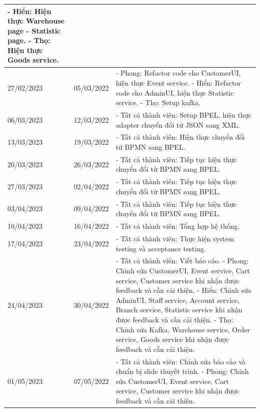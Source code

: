 {\begin{longtable}{| p{2cm} | p{2cm} | p{10cm} |}
    \newline
    - Hiển: Hiện thực Warehouse page - Statistic page. 
    \newline
    - Thọ: Hiện thực Goods service. \\
	\hline
	27/02/2023 & 05/03/2022 & 
    - Phong: Refactor code cho CustomerUI, hiện thực Event service. 
    \newline
    - Hiển: Refactor code cho AdminUI, hiện thực Statistic service. 
    \newline
    - Thọ: Setup kafka. \\
	\hline
	06/03/2023 & 12/03/2022 & 
    - Tất cả thành viên: Setup BPEL, hiện thực adapter chuyển đổi từ JSON sang XML. \\
	\hline
	13/03/2023 & 19/03/2022 & 
    - Tất cả thành viên: Hiện thực chuyển đổi từ BPMN sang BPEL. \\
	\hline
	20/03/2023 & 26/03/2022 & 
    - Tất cả thành viên: Tiếp tục hiện thực chuyển đổi từ BPMN sang BPEL. \\
	\hline
	27/03/2023 & 02/04/2022 & 
    - Tất cả thành viên: Tiếp tục hiện thực chuyển đổi từ BPMN sang BPEL. \\
	\hline
	03/04/2023 & 09/04/2022 & 
    - Tất cả thành viên: Tiếp tục hiện thực chuyển đổi từ BPMN sang BPEL. \\
	\hline
	10/04/2023 & 16/04/2022 & 
    - Tất cả thành viên: Tổng hợp hệ thống. \\
	\hline
	17/04/2023 & 23/04/2022 & 
    - Tất cả thành viên: Thực hiện system testing và acceptance testing. \\
	\hline
	24/04/2023 & 30/04/2022 & 
    - Tất cả thành viên: Viết báo cáo.
    \newline
    - Phong: Chỉnh sửa CustomerUI, Event service, Cart service, Customer service khi nhận được feedback và cần cải thiện. 
    \newline
    - Hiển: Chỉnh sửa AdminUI, Staff service, Account service, Branch service, Statistic service khi nhận được feedback và cần cải thiện. 
    \newline
    - Thọ: Chỉnh sửa Kafka, Warehouse service, Order service, Goods service khi nhận được feedback và cần cải thiện. \\
	\hline
	01/05/2023 & 07/05/2022 & 
    - Tất cả thành viên: Chỉnh sửa báo cáo và chuẩn bị slide thuyết trình.
    \newline
    - Phong: Chỉnh sửa CustomerUI, Event service, Cart service, Customer service khi nhận được feedback và cần cải thiện. 
    \newline

\end{longtable}}

